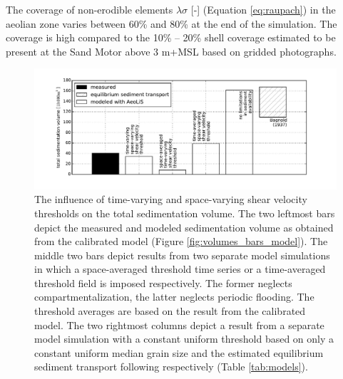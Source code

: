 \documentclass[preprint,12pt,authoryear]{elsarticle}
\begin{document}
The coverage of non-erodible elements $\lambda \sigma$ [-] (Equation
\ref{eq:raupach}) in the aeolian zone varies between 60\% and 80\% at
the end of the simulation. The coverage is high compared to the 10\%
-- 20\% shell coverage estimated to be present at the Sand Motor above
3 m+MSL based on gridded photographs.

\begin{figure}
  \centering
  \includegraphics[width=\columnwidth]{../Figures/space_vs_time}
  \caption{The influence of time-varying and space-varying shear
    velocity thresholds on the total sedimentation volume. The two
    leftmost bars depict the measured and modeled sedimentation volume
    as obtained from the calibrated model (Figure
    \ref{fig:volumes_bars_model}). The middle two bars depict results
    from two separate model simulations in which a space-averaged
    threshold time series or a time-averaged threshold field is
    imposed respectively. The former neglects compartmentalization,
    the latter neglects periodic flooding. The threshold averages are
    based on the result from the calibrated model. The two rightmost
    columns depict a result from a separate model simulation with a
    constant uniform threshold based on only a constant uniform median
    grain size and the estimated equilibrium sediment transport
    following \citet{Bagnold1937a} respectively (Table
    \ref{tab:models}).}
  \label{fig:space_vs_time}
\end{figure}
\end{document}
